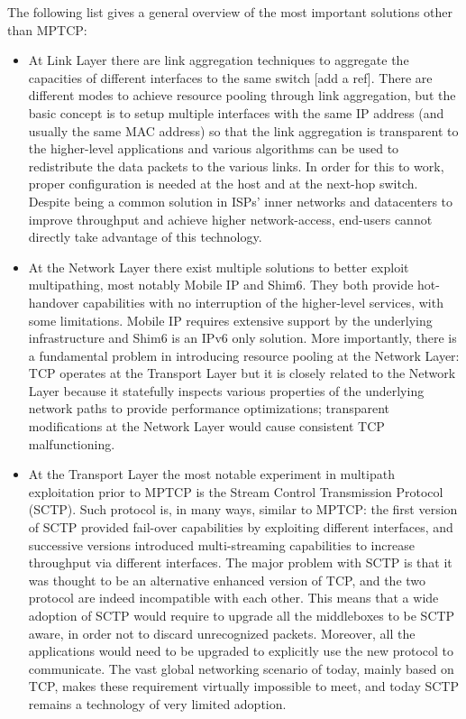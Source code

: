 The following list gives a general overview of the most important solutions other than MPTCP:
\begin{itemize}
  \item At Link Layer there are link aggregation techniques to aggregate the capacities of different interfaces to the same switch [add a ref]. There are different modes to achieve resource pooling through link aggregation, but the basic concept is to setup multiple interfaces with the same IP address (and usually the same MAC address) so that the link aggregation is transparent to the higher-level applications and various algorithms can be used to redistribute the data packets to the various links. In order for this to work, proper configuration is needed at the host and at the next-hop switch. Despite being a common solution in ISPs' inner networks and datacenters to improve throughput and achieve higher network-access, end-users cannot directly take advantage of this technology.


  \item At the Network Layer there exist multiple solutions to better exploit multipathing, most notably Mobile IP and Shim6. They both provide hot-handover capabilities with no interruption of the higher-level services, with some limitations. Mobile IP requires extensive support by the underlying infrastructure and Shim6 is an IPv6 only solution. More importantly, there is a fundamental problem in introducing resource pooling at the Network Layer: TCP operates at the Transport Layer but it is closely related to the Network Layer because it statefully inspects various properties of the underlying network paths to provide performance optimizations; transparent modifications at the Network Layer would cause consistent TCP malfunctioning.


  \item At the Transport Layer the most notable experiment in multipath exploitation prior to MPTCP is the Stream Control Transmission Protocol (SCTP). Such protocol is, in many ways, similar to MPTCP: the first version of SCTP provided fail-over capabilities by exploiting different interfaces, and successive versions introduced multi-streaming capabilities to increase throughput via different interfaces. The major problem with SCTP is that it was thought to be an alternative enhanced version of TCP, and the two protocol are indeed incompatible with each other. This means that a wide adoption of SCTP would require to upgrade all the middleboxes to be SCTP aware, in order not to discard unrecognized packets. Moreover, all the applications would need to be upgraded to explicitly use the new protocol to communicate. The vast global networking scenario of today, mainly based on TCP, makes these requirement virtually impossible to meet, and today SCTP remains a technology of very limited adoption.
\end{itemize}



